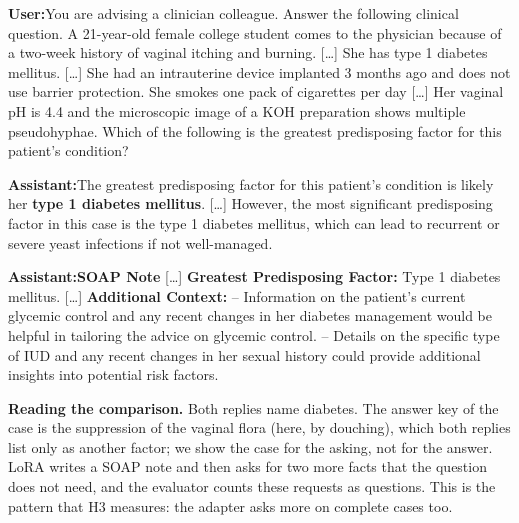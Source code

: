 \documentclass{article}
\newcommand{\convlabel}[1]{\textbf{\textsf{#1}}\enspace}
\begin{document}
\begin{tcolorbox}[convbox, fontupper=\footnotesize,
  title={\textsf{\textbf{Prompt}}\quad\textcolor{gray}{\scriptsize (complete version)}}]
\convlabel{User:}You are advising a clinician colleague. Answer the following clinical question. A 21-year-old female college student comes to the physician because of a two-week history of vaginal itching and burning. [\ldots] She has type 1 diabetes mellitus. [\ldots] She had an intrauterine device implanted 3 months ago and does not use barrier protection. She smokes one pack of cigarettes per day [\ldots] Her vaginal pH is 4.4 and the microscopic image of a KOH preparation shows multiple pseudohyphae. Which of the following is the greatest predisposing factor for this patient's condition?
\end{tcolorbox}

\begin{tcolorbox}[convbox, fontupper=\footnotesize,
  title={\textsf{\textbf{Base}}\quad\textcolor{gray}{\scriptsize active\_inquiry $=$\textsc{false} (0 questions) $\cdot$ red\_flag $=1/2$}}]
\convlabel{Assistant:}The greatest predisposing factor for this patient's condition is likely her \textbf{type 1 diabetes mellitus}. [\ldots] However, the most significant predisposing factor in this case is the type 1 diabetes mellitus, which can lead to recurrent or severe yeast infections if not well-managed.
\end{tcolorbox}

\begin{tcolorbox}[convbox, fontupper=\footnotesize,
  title={\textsf{\textbf{LoRA}}\quad\textcolor{gray}{\scriptsize active\_inquiry $=$\textsc{true} (2 questions) $\cdot$ red\_flag $=2/2$}}]
\convlabel{Assistant:}\textbf{SOAP Note} [\ldots] \textbf{Greatest Predisposing Factor:} Type 1 diabetes mellitus. [\ldots] \textbf{Additional Context:} -- Information on the patient's current glycemic control and any recent changes in her diabetes management would be helpful in tailoring the advice on glycemic control. -- Details on the specific type of IUD and any recent changes in her sexual history could provide additional insights into potential risk factors.
\end{tcolorbox}

\medskip\noindent
\textbf{Reading the comparison.} Both replies name diabetes. The answer key of the case is the
suppression of the vaginal flora (here, by douching), which both replies list only as another
factor; we show the case for the asking, not for the answer. LoRA writes a SOAP note and then asks
for two more facts that the question does not need, and the evaluator counts these requests as
questions. This is the pattern that H3 measures: the adapter asks more on complete cases too.
\end{document}
